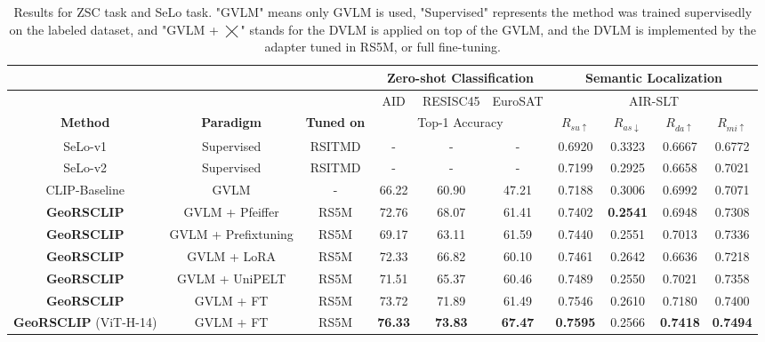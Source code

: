 \documentclass[journal]{IEEEtran}
\begin{document}
\begin{table*}
\caption{Results for ZSC task and SeLo task. "GVLM" means only GVLM is used, "Supervised" represents the method was trained supervisedly on the labeled dataset, and "GVLM + $\bigtimes$" stands for the DVLM is applied on top of the GVLM, and the DVLM is implemented by the adapter tuned in RS5M, or full fine-tuning.}
\label{table:zsc_selo}
\centering
\small
\begin{tabular}{cccccccccc}
\toprule
\multicolumn{3}{c}{} & \multicolumn{3}{c}{\textbf{Zero-shot Classification}} & \multicolumn{4}{c}{\textbf{Semantic Localization}} \\
\midrule
\multicolumn{3}{c}{\textbf{}} & AID & RESISC45 & EuroSAT & \multicolumn{4}{c}{AIR-SLT} \\
\midrule
\textbf{\textbf{Method}} & \textbf{\textbf{Paradigm}} & \textbf{\textbf{Tuned on}} & \multicolumn{3}{c}{Top-1 Accuracy} & {$R_{su\uparrow}$} & {$R_{as \downarrow}$} & {$R_{da\uparrow}$} & {$R_{mi\uparrow}$} \\
\midrule
SeLo-v1 \cite{selo} & Supervised & RSITMD & - & - & - & 0.6920 & 0.3323 & 0.6667 & 0.6772\\
SeLo-v2 \cite{selov2} & Supervised & RSITMD & - & - & - & 0.7199 & 0.2925 & 0.6658 & 0.7021\\
CLIP-Baseline \cite{clip} & GVLM & - & 66.22  & 60.90 & 47.21 &0.7188 &	0.3006	& 0.6992 &	0.7071  \\
\textbf{GeoRSCLIP} & GVLM + Pfeiffer & RS5M  & 72.76 & 68.07 & 61.41 & 0.7402 & \textbf{0.2541}  & 0.6948 & 0.7308\\
\textbf{GeoRSCLIP}& GVLM + Prefix\-tuning & RS5M  & 69.17 & 63.11 & 61.59 & 0.7440  & 0.2551 & 0.7013 & 0.7336 \\
\textbf{GeoRSCLIP}& GVLM + LoRA & RS5M & 72.33 & 66.82 & 60.10 & 0.7461 & 0.2642  & 0.6636 & 0.7218\\
\textbf{GeoRSCLIP}& GVLM + UniPELT & RS5M  & 71.51 & 65.37 & 60.46 & 0.7489  & 0.2550 & 0.7021 & 0.7358\\
\textbf{GeoRSCLIP} & GVLM + FT & RS5M & 73.72 & 71.89 & 61.49 & 0.7546	& 0.2610	 & 0.7180		& 0.7400\\
\textbf{GeoRSCLIP} (ViT-H-14) & GVLM + FT & RS5M & \textbf{76.33} & \textbf{73.83} & \textbf{67.47}  & \textbf{0.7595} &	0.2566	 & \textbf{0.7418} & \textbf{0.7494} \\
\bottomrule
\end{tabular}
\end{table*}
\end{document}
